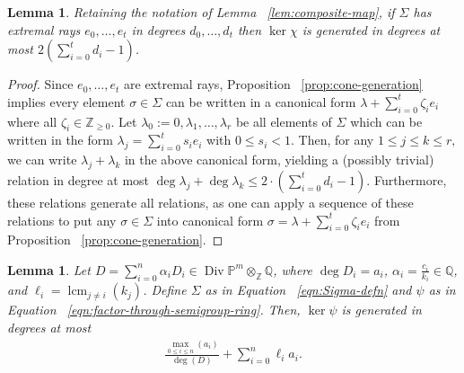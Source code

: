 \documentclass{amsart}
\theoremstyle{plain}
\newtheorem{lem}[thm]{Lemma}
\theoremstyle{definition}
\theoremstyle{remark}
\numberwithin{equation}{section}
\newcommand\bq{{\mathbb Q}}
\newcommand\bp{{\mathbb P}}
\newcommand\bz{{\mathbb Z}}
\DeclareMathOperator\di{Div}
\newcommand\bida{a}
\DeclareMathOperator{\lcm}{lcm}
\begin{document}
\begin{lem}
\label{lem:bound-ker-chi}
Retaining the notation of Lemma ~\ref{lem:composite-map}, if $\Sigma$ has
extremal rays $e_0,\ldots, e_t$ in degrees $d_0, \ldots, d_t$ then $\ker \chi$
is generated in degrees at most $2(\sum_{i=0}^{t}d_i-1)$.
\end{lem}
\begin{proof}
Since $e_0, \ldots, e_t$ are extremal rays, Proposition
~\ref{prop:cone-generation} implies every element $\sigma \in \Sigma$ can be written
in a canonical form $\lambda + \sum_{i=0}^{t} \zeta_i e_i$ where all $\zeta_i \in \mathbb{Z}_{\ge 0}$.  Let
$\lambda_0 :=
0,\lambda_1, \ldots, \lambda_r$ be all elements of $\Sigma$ which
can be
written in the form $\lambda_j = \sum_{i=0}^{t}s_i e_i$ with $0
\leq s_i < 1.$ Then, for any $1 \leq j \leq k \leq r,$ we can write $\lambda_j + \lambda_k$ in
the above canonical form, yielding a (possibly trivial) relation in degree at most $\deg \lambda_j
+ \deg \lambda_k\leq 2 \cdot \left( \sum_{i=0}^{t}d_i -1 \right).$
Furthermore, these relations generate all relations, as one can apply a
sequence of these relations to put any $\sigma \in \Sigma$ into canonical form
$\sigma = \lambda + \sum_{i=0}^{t}\zeta_i e_i$ from Proposition
~\ref{prop:cone-generation}.
\end{proof}
\begin{lem}
\label{lem:proj-relations-psi}
Let $D = \sum_{i=0}^{n} \alpha_i D_i \in \di \bp^m \otimes_\bz \bq$, where
$\deg D_i = \bida_i$, $\alpha_i = \frac{c_i}{k_i}\in \bq$, and
$\ell_i = \lcm_{j \neq i} (k_j)$. Define $\Sigma$ as in Equation
~\eqref{eqn:Sigma-defn} and $\psi$ as in Equation
~\eqref{eqn:factor-through-semigroup-ring}. Then, $\ker \psi$ is
generated in degrees at most
\begin{align}
\label{eqn:proj-relation-degree}
	\frac{\max_{0 \le i \le n}(\bida_i)}{\deg(D)} +  \sum_{i=0}^n \ell_i a_i.
\end{align}

\end{lem}
\end{document}
